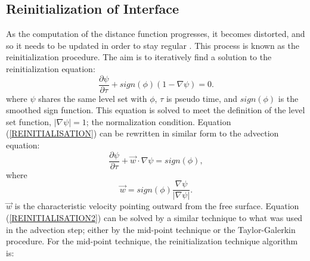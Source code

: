 %
%


\subsection{Reinitialization of Interface}

As the computation of the distance function progresses, it becomes distorted, and so it needs to be updated in order to stay regular \cite{SUSSMAN1994}. This process is known as the reinitialization procedure. The aim is to iteratively find a solution to the reinitialization equation:
%
\begin{equation}
\frac{\partial \psi}{\partial \tau} + sign(\phi)(1 - \nabla \psi) = 0.
\label{REINITIALISATION}
\end{equation}
%
where $\psi$ shares the same level set with $\phi$, $\tau$ is pseudo time, and $sign(\phi)$ is the smoothed sign function. This equation is solved to meet the definition of the level set function, $\lvert \nabla \psi \rvert = 1$; the normalization condition. Equation (\ref{REINITIALISATION}) can be rewritten in similar form to the advection equation:
%
\begin{equation}
\frac{\partial \psi}{\partial \tau} + \vec{w} \cdot \nabla \psi = sign(\phi),
\label{REINITIALISATION2}
\end{equation}
%
where
%
\begin{equation}
\vec{w} = sign(\phi)\frac{\nabla \psi}{|\nabla \psi|}.
\label{REINITIALISATION3}
\end{equation}
%
$\vec{w}$ is the characteristic velocity pointing outward from the free surface. Equation (\ref{REINITIALISATION2}) can be solved by a similar technique to what was used in the advection step; either by the mid-point technique \cite{BOURGOUIN2006} or the Taylor-Galerkin procedure. For the mid-point technique, the reinitialization technique algorithm is:

